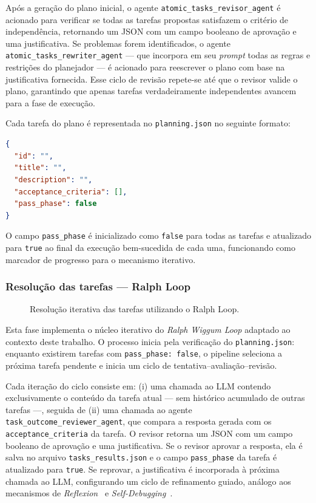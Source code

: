 \documentclass[a4paper,10pt,twocolumn]{article}
\begin{document}
Após a geração do plano inicial, o agente \texttt{atomic\_tasks\_revisor\_agent} é acionado para verificar se todas as tarefas propostas satisfazem o critério de independência, retornando um JSON com um campo booleano de aprovação e uma justificativa. Se problemas forem identificados, o agente \texttt{atomic\_tasks\_rewriter\_agent} — que incorpora em seu \textit{prompt} todas as regras e restrições do planejador — é acionado para reescrever o plano com base na justificativa fornecida. Esse ciclo de revisão repete-se até que o revisor valide o plano, garantindo que apenas tarefas verdadeiramente independentes avancem para a fase de execução.

Cada tarefa do plano é representada no \texttt{planning.json} no seguinte formato:

\begin{lstlisting}[language=json]
{
  "id": "",
  "title": "",
  "description": "",
  "acceptance_criteria": [],
  "pass_phase": false
}
\end{lstlisting}

O campo \texttt{pass\_phase} é inicializado como \texttt{false} para todas as tarefas e atualizado para \texttt{true} ao final da execução bem-sucedida de cada uma, funcionando como marcador de progresso para o mecanismo iterativo.

\subsubsection{Resolução das tarefas — Ralph Loop}

\begin{figure}[H]
  \centering
  
  \caption{Resolução iterativa das tarefas utilizando o Ralph Loop.}
  \label{fig:ralph_loop}
\end{figure}

Esta fase implementa o núcleo iterativo do \textit{Ralph Wiggum Loop} adaptado ao contexto deste trabalho. O processo inicia pela verificação do \texttt{planning.json}: enquanto existirem tarefas com \texttt{pass\_phase: false}, o pipeline seleciona a próxima tarefa pendente e inicia um ciclo de tentativa–avaliação–revisão.

Cada iteração do ciclo consiste em: (i) uma chamada ao LLM contendo exclusivamente o conteúdo da tarefa atual — sem histórico acumulado de outras tarefas —, seguida de (ii) uma chamada ao agente \texttt{task\_outcome\_reviewer\_agent}, que compara a resposta gerada com os \texttt{acceptance\_criteria} da tarefa. O revisor retorna um JSON com um campo booleano de aprovação e uma justificativa. Se o revisor aprovar a resposta, ela é salva no arquivo \texttt{tasks\_results.json} e o campo \texttt{pass\_phase} da tarefa é atualizado para \texttt{true}. Se reprovar, a justificativa é incorporada à próxima chamada ao LLM, configurando um ciclo de refinamento guiado, análogo aos mecanismos de \textit{Reflexion}~\cite{shinn2023reflexion} e \textit{Self-Debugging}~\cite{chen2023selfdebug}.
\end{document}

